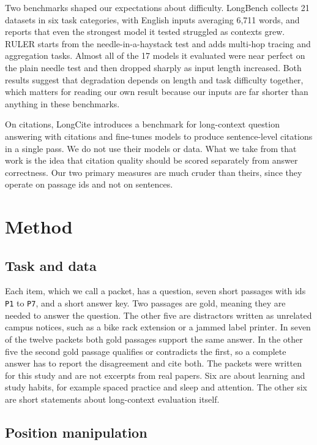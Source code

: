 \documentclass[11pt,a4paper]{article}
\begin{document}
Two benchmarks shaped our expectations about difficulty.
LongBench \citep{bai2024longbench} collects 21 datasets in six task categories, with English inputs averaging 6,711 words,
and reports that even the strongest model it tested struggled as contexts grew.
RULER \citep{hsieh2024ruler} starts from the needle-in-a-haystack test and adds multi-hop tracing and aggregation tasks.
Almost all of the 17 models it evaluated were near perfect on the plain needle test and then dropped sharply as input length increased.
Both results suggest that degradation depends on length and task difficulty together,
which matters for reading our own result because our inputs are far shorter than anything in these benchmarks.

On citations, LongCite \citep{zhang2025longcite} introduces a benchmark for long-context question answering with citations
and fine-tunes models to produce sentence-level citations in a single pass.
We do not use their models or data.
What we take from that work is the idea that citation quality should be scored separately from answer correctness.
Our two primary measures are much cruder than theirs, since they operate on passage ids and not on sentences.

\section{Method}
\label{sec:method}

\subsection{Task and data}

Each item, which we call a packet, has a question, seven short passages with ids \texttt{P1} to \texttt{P7}, and a short answer key.
Two passages are gold, meaning they are needed to answer the question.
The other five are distractors written as unrelated campus notices, such as a bike rack extension or a jammed label printer.
In seven of the twelve packets both gold passages support the same answer.
In the other five the second gold passage qualifies or contradicts the first,
so a complete answer has to report the disagreement and cite both.
The packets were written for this study and are not excerpts from real papers.
Six are about learning and study habits, for example spaced practice and sleep and attention.
The other six are short statements about long-context evaluation itself.

\subsection{Position manipulation}
\end{document}
